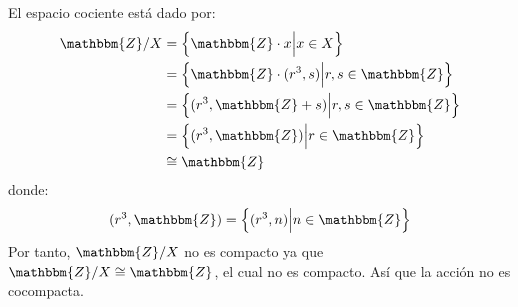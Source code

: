 \documentclass[12pt]{report}
\newcounter{it}
\theoremstyle{largebreak}
\newcommand{\bbm}[1]{\ensuremath{\mathbbm{#1}}}
\begin{document}
\begin{sol}
        El espacio cociente está dado por:
        \begin{equation*}
            \begin{split}
                \bbm{Z}/X&=\left\{\bbm{Z}\cdot x\Big|x\in X \right\}\\
                &=\left\{\bbm{Z}\cdot (r^3,s)\Big|r,s\in\bbm{Z} \right\}\\
                &=\left\{(r^3,\bbm{Z}+s)\Big|r,s\in\bbm{Z} \right\}\\
                &=\left\{(r^3,\bbm{Z})\Big|r\in\bbm{Z} \right\}\\
                &\cong\bbm{Z}\\
            \end{split}
        \end{equation*}
        donde:
        \begin{equation*}
            (r^3,\bbm{Z})=\left\{(r^3,n)\Big|n\in\bbm{Z} \right\}
        \end{equation*}
        Por tanto, $\bbm{Z}/X$ no es compacto ya que $\bbm{Z}/X\cong\bbm{Z}$, el cual no es compacto. Así que la acción no es cocompacta.
    \end{sol}
\end{document}
